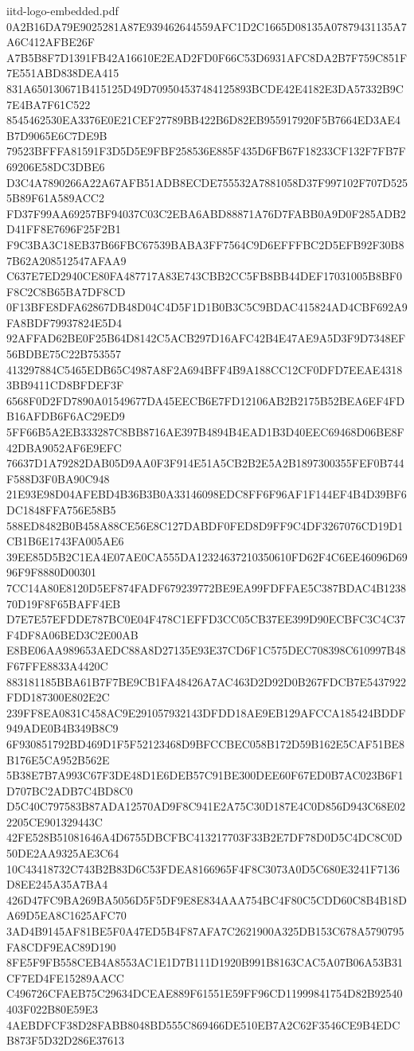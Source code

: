 \begin{filecontents*}[overwrite]{iitd-logo-embedded.pdf}
0A2B16DA79E9025281A87E939462644559AFC1D2C1665D08135A07879431135A7A6C412AFBE26F
A7B5B8F7D1391FB42A16610E2EAD2FD0F66C53D6931AFC8DA2B7F759C851F7E551ABD838DEA415
831A650130671B415125D49D709504537484125893BCDE42E4182E3DA57332B9C7E4BA7F61C522
8545462530EA3376E0E21CEF27789BB422B6D82EB955917920F5B7664ED3AE4B7D9065E6C7DE9B
79523BFFFA81591F3D5D5E9FBF258536E885F435D6FB67F18233CF132F7FB7F69206E58DC3DBE6
D3C4A7890266A22A67AFB51ADB8ECDE755532A7881058D37F997102F707D5255B89F61A589ACC2
FD37F99AA69257BF94037C03C2EBA6ABD88871A76D7FABB0A9D0F285ADB2D41FF8E7696F25F2B1
F9C3BA3C18EB37B66FBC67539BABA3FF7564C9D6EFFFBC2D5EFB92F30B87B62A208512547AFAA9
C637E7ED2940CE80FA487717A83E743CBB2CC5FB8BB44DEF17031005B8BF0F8C2C8B65BA7DF8CD
0F13BFE8DFA62867DB48D04C4D5F1D1B0B3C5C9BDAC415824AD4CBF692A9FA8BDF79937824E5D4
92AFFAD62BE0F25B64D8142C5ACB297D16AFC42B4E47AE9A5D3F9D7348EF56BDBE75C22B753557
413297884C5465EDB65C4987A8F2A694BFF4B9A188CC12CF0DFD7EEAE43183BB9411CD8BFDEF3F
6568F0D2FD7890A01549677DA45EECB6E7FD12106AB2B2175B52BEA6EF4FDB16AFDB6F6AC29ED9
5FF66B5A2EB333287C8BB8716AE397B4894B4EAD1B3D40EEC69468D06BE8F42DBA9052AF6E9EFC
76637D1A79282DAB05D9AA0F3F914E51A5CB2B2E5A2B1897300355FEF0B744F588D3F0BA90C948
21E93E98D04AFEBD4B36B3B0A33146098EDC8FF6F96AF1F144EF4B4D39BF6DC1848FFA756E58B5
588ED8482B0B458A88CE56E8C127DABDF0FED8D9FF9C4DF3267076CD19D1CB1B6E1743FA005AE6
39EE85D5B2C1EA4E07AE0CA555DA12324637210350610FD62F4C6EE46096D6996F9F8880D00301
7CC14A80E8120D5EF874FADF679239772BE9EA99FDFFAE5C387BDAC4B123870D19F8F65BAFF4EB
D7E7E57EFDDE787BC0E04F478C1EFFD3CC05CB37EE399D90ECBFC3C4C37F4DF8A06BED3C2E00AB
E8BE06AA989653AEDC88A8D27135E93E37CD6F1C575DEC708398C610997B48F67FFE8833A4420C
883181185BBA61B7F7BE9CB1FA48426A7AC463D2D92D0B267FDCB7E5437922FDD187300E802E2C
239FF8EA0831C458AC9E291057932143DFDD18AE9EB129AFCCA185424BDDF949ADE0B4B349B8C9
6F930851792BD469D1F5F52123468D9BFCCBEC058B172D59B162E5CAF51BE8B176E5CA952B562E
5B38E7B7A993C67F3DE48D1E6DEB57C91BE300DEE60F67ED0B7AC023B6F1D707BC2ADB7C4BD8C0
D5C40C797583B87ADA12570AD9F8C941E2A75C30D187E4C0D856D943C68E022205CE901329443C
42FE528B51081646A4D6755DBCFBC413217703F33B2E7DF78D0D5C4DC8C0D50DE2AA9325AE3C64
10C43418732C743B2B83D6C53FDEA8166965F4F8C3073A0D5C680E3241F7136D8EE245A35A7BA4
426D47FC9BA269BA5056D5F5DF9E8E834AAA754BC4F80C5CDD60C8B4B18DA69D5EA8C1625AFC70
3AD4B9145AF81BE5F0A47ED5B4F87AFA7C2621900A325DB153C678A5790795FA8CDF9EAC89D190
8FE5F9FB558CEB4A8553AC1E1D7B111D1920B991B8163CAC5A07B06A53B31CF7ED4FE15289AACC
C496726CFAEB75C29634DCEAE889F61551E59FF96CD11999841754D82B92540403F022B80E59E3
4AEBDFCF38D28FABB8048BD555C869466DE510EB7A2C62F3546CE9B4EDCB873F5D32D286E37613

\end{filecontents*}
